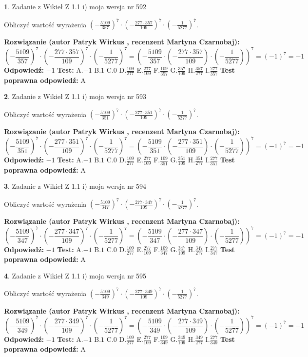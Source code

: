 \documentclass[12pt, a4paper]{article}
\theoremstyle{definition} %
\newtheorem{zad}{}
\newcommand{\zadStart}[1]{\begin{zad}#1\newline}
\newcommand{\zadStop}{\end{zad}}
\newcommand{\rozwStart}[2]{\noindent \textbf{Rozwiązanie (autor #1 , recenzent #2): }\newline}
\newcommand{\rozwStop}{\newline}
\newcommand{\odpStart}{\noindent \textbf{Odpowiedź:}\newline}
\newcommand{\odpStop}{\newline}
\newcommand{\testStart}{\noindent \textbf{Test:}\newline}
\newcommand{\testStop}{\newline}
\newcommand{\kluczStart}{\noindent \textbf{Test poprawna odpowiedź:}\newline}
\newcommand{\kluczStop}{\newline}
\begin{document}
\zadStart{Zadanie z Wikieł Z 1.1 i) moja wersja nr 592}

Obliczyć wartość wyrażenia $(-\frac{5109}{357})^{7} \cdot (-\frac{277 \cdot 357}{109})^{7} \cdot (-\frac{1}{5277})^{7}$.
\zadStop
\rozwStart{Patryk Wirkus}{Martyna Czarnobaj}
$$(-\frac{5109}{357})^{7} \cdot (-\frac{277 \cdot 357}{109})^{7} \cdot (-\frac{1}{5277})^{7} = (-\frac{5109}{357} \cdot (-\frac{277 \cdot 357}{109}) \cdot (-\frac{1}{5277}))^{7} = (-1)^{7} = -1$$
\rozwStop
\odpStart
$-1$
\odpStop
\testStart
A.$-1$ B.$1$ C.$0$ D.$\frac{109}{277}$ E.$\frac{277}{109}$
F.$\frac{109}{357}$ G.$\frac{357}{109}$
H.$\frac{357}{277}$
I.$\frac{277}{357}$
\testStop
\kluczStart
A
\kluczStop



\zadStart{Zadanie z Wikieł Z 1.1 i) moja wersja nr 593}

Obliczyć wartość wyrażenia $(-\frac{5109}{351})^{7} \cdot (-\frac{277 \cdot 351}{109})^{7} \cdot (-\frac{1}{5277})^{7}$.
\zadStop
\rozwStart{Patryk Wirkus}{Martyna Czarnobaj}
$$(-\frac{5109}{351})^{7} \cdot (-\frac{277 \cdot 351}{109})^{7} \cdot (-\frac{1}{5277})^{7} = (-\frac{5109}{351} \cdot (-\frac{277 \cdot 351}{109}) \cdot (-\frac{1}{5277}))^{7} = (-1)^{7} = -1$$
\rozwStop
\odpStart
$-1$
\odpStop
\testStart
A.$-1$ B.$1$ C.$0$ D.$\frac{109}{277}$ E.$\frac{277}{109}$
F.$\frac{109}{351}$ G.$\frac{351}{109}$
H.$\frac{351}{277}$
I.$\frac{277}{351}$
\testStop
\kluczStart
A
\kluczStop



\zadStart{Zadanie z Wikieł Z 1.1 i) moja wersja nr 594}

Obliczyć wartość wyrażenia $(-\frac{5109}{347})^{7} \cdot (-\frac{277 \cdot 347}{109})^{7} \cdot (-\frac{1}{5277})^{7}$.
\zadStop
\rozwStart{Patryk Wirkus}{Martyna Czarnobaj}
$$(-\frac{5109}{347})^{7} \cdot (-\frac{277 \cdot 347}{109})^{7} \cdot (-\frac{1}{5277})^{7} = (-\frac{5109}{347} \cdot (-\frac{277 \cdot 347}{109}) \cdot (-\frac{1}{5277}))^{7} = (-1)^{7} = -1$$
\rozwStop
\odpStart
$-1$
\odpStop
\testStart
A.$-1$ B.$1$ C.$0$ D.$\frac{109}{277}$ E.$\frac{277}{109}$
F.$\frac{109}{347}$ G.$\frac{347}{109}$
H.$\frac{347}{277}$
I.$\frac{277}{347}$
\testStop
\kluczStart
A
\kluczStop



\zadStart{Zadanie z Wikieł Z 1.1 i) moja wersja nr 595}

Obliczyć wartość wyrażenia $(-\frac{5109}{349})^{7} \cdot (-\frac{277 \cdot 349}{109})^{7} \cdot (-\frac{1}{5277})^{7}$.
\zadStop
\rozwStart{Patryk Wirkus}{Martyna Czarnobaj}
$$(-\frac{5109}{349})^{7} \cdot (-\frac{277 \cdot 349}{109})^{7} \cdot (-\frac{1}{5277})^{7} = (-\frac{5109}{349} \cdot (-\frac{277 \cdot 349}{109}) \cdot (-\frac{1}{5277}))^{7} = (-1)^{7} = -1$$
\rozwStop
\odpStart
$-1$
\odpStop
\testStart
A.$-1$ B.$1$ C.$0$ D.$\frac{109}{277}$ E.$\frac{277}{109}$
F.$\frac{109}{349}$ G.$\frac{349}{109}$
H.$\frac{349}{277}$
I.$\frac{277}{349}$
\testStop
\kluczStart
A
\kluczStop
\end{document}
